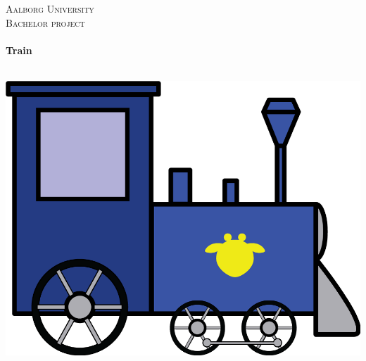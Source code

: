 \begin{titlingpage}\centering



\textsc{\LARGE Aalborg University}\\[0.3cm]

\textsc{\Large Bachelor project}\\[0.3cm]

\HRule \\[0.4cm]
{\Huge \bfseries Train}

\HRule \\[2cm]

\includegraphics[width=\textwidth]{img/train}

\end{titlingpage}
